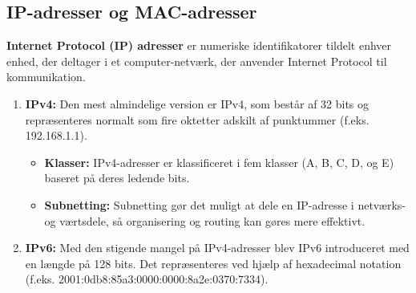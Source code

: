 \subsection{IP-adresser og MAC-adresser}
\textbf{Internet Protocol (IP) adresser} er numeriske identifikatorer tildelt enhver enhed, der deltager i et computer-netværk, der anvender Internet Protocol til kommunikation.
\begin{enumerate}
	\item \textbf{IPv4:} Den mest almindelige version er IPv4, som består af 32 bits og repræsenteres normalt som fire oktetter adskilt af punktummer (f.eks. 192.168.1.1).
	\begin{itemize}
		\item \textbf{Klasser:} IPv4-adresser er klassificeret i fem klasser (A, B, C, D, og E) baseret på deres ledende bits.
		\item \textbf{Subnetting:} Subnetting gør det muligt at dele en IP-adresse i netværks- og værtsdele, så organisering og routing kan gøres mere effektivt.
	\end{itemize}
	\item \textbf{IPv6:} Med den stigende mangel på IPv4-adresser blev IPv6 introduceret med en længde på 128 bits. Det repræsenteres ved hjælp af hexadecimal notation (f.eks. 2001:0db8:85a3:0000:0000:8a2e:0370:7334).
\end{enumerate}

